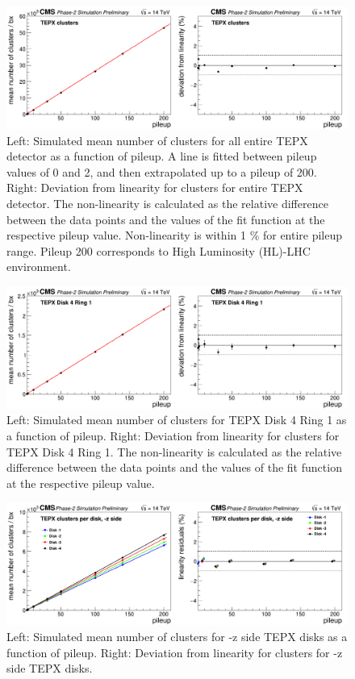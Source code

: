 \newpage
\begin{figure}[H]
  \centering
  \includegraphics[width=1\columnwidth]{./totalclusters.png}
  \caption{\onehalfspacing Left: Simulated mean number of clusters for all entire TEPX detector as a function of pileup. A line is fitted between pileup values of 0 and 2, and then extrapolated up to a pileup of 200. Right: Deviation from linearity for clusters for entire TEPX detector. The non-linearity is calculated as the relative difference between the data points and the values of the fit function at the respective pileup value. Non-linearity is within 1 \% for entire pileup range. Pileup 200 corresponds to High Luminosity (HL)-LHC environment.}
  \label{fig:CMS}
\end{figure}



\begin{figure}[H]
  \centering
  \includegraphics[width=1\columnwidth]{./clustersD4R1.png}
  \caption{\onehalfspacing Left: Simulated mean number of clusters for TEPX Disk 4 Ring 1 as a function of pileup. Right: Deviation from linearity for clusters for TEPX Disk 4 Ring 1. The non-linearity is calculated as the relative difference between the data points and the values of the fit function at the respective pileup value.}
  \label{fig:CMS}
\end{figure}



\begin{figure}[H]
  \centering
  \includegraphics[width=1 \columnwidth]{./clustersperdisk-z.png}
  \caption{Left: Simulated mean number of clusters for -z side TEPX disks as a function of pileup. Right: Deviation from linearity for clusters for -z side TEPX disks.}
  \label{fig:CMS}
\end{figure}


